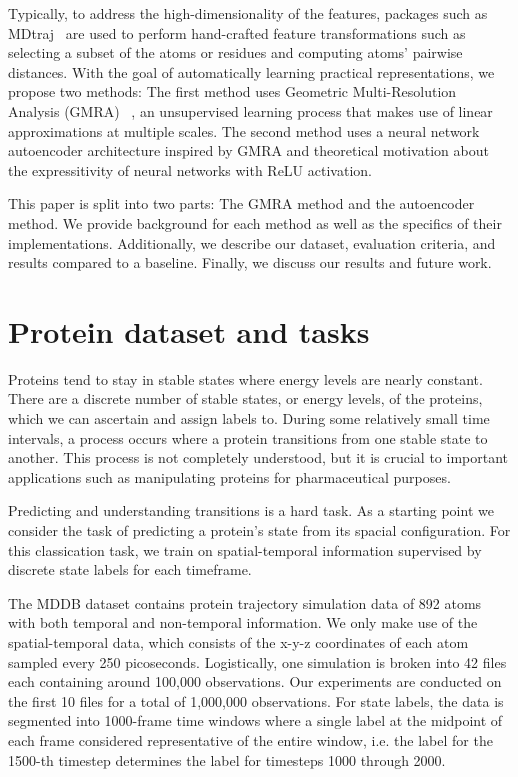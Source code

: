 \documentclass{article}
\begin{document}
	Typically, to address the high-dimensionality of the features, packages such as MDtraj~\cite{McGibbon2015MDTraj} are used to perform hand-crafted feature transformations such as selecting a subset of the atoms or residues and computing atoms' pairwise distances. With the goal of automatically learning practical representations, we propose two methods: The first method uses Geometric Multi-Resolution Analysis (GMRA) ~\cite{allard2012multi}, an unsupervised learning process that makes use of linear approximations at multiple scales. The second method uses a neural network autoencoder architecture inspired by GMRA and theoretical motivation about the expressitivity of neural networks with ReLU activation.
	
	This paper is split into two parts: The GMRA method and the autoencoder method. We provide background for each method as well as the specifics of their implementations. Additionally, we describe our dataset, evaluation criteria, and results compared to a baseline. Finally, we discuss our results and future work.
	
	\section{Protein dataset and tasks}
	Proteins tend to stay in stable states where energy levels are nearly constant. There are a discrete number of stable states, or energy levels, of the proteins, which we can ascertain and assign labels to. During some relatively small time intervals, a process occurs where a protein transitions from one stable state to another. This process is not completely understood, but it is crucial to important applications such as manipulating proteins for pharmaceutical purposes.
	
	Predicting and understanding transitions is a hard task. As a starting point we consider the task of predicting a protein's state from its spacial configuration. For this classication task, we train on spatial-temporal information supervised by discrete state labels for each timeframe.
	
	The MDDB dataset contains protein trajectory simulation data of 892 atoms with both temporal and non-temporal information. We only make use of the spatial-temporal data, which consists of the x-y-z coordinates of each atom sampled every 250 picoseconds. Logistically, one simulation is broken into 42 files each containing around 100,000 observations. Our experiments are conducted on the first 10 files for a total of 1,000,000 observations. For state labels, the data is segmented into 1000-frame time windows where a single label at the midpoint of each frame considered representative of the entire window, i.e. the label for the 1500-th timestep determines the label for timesteps 1000 through 2000.
	
\end{document}
